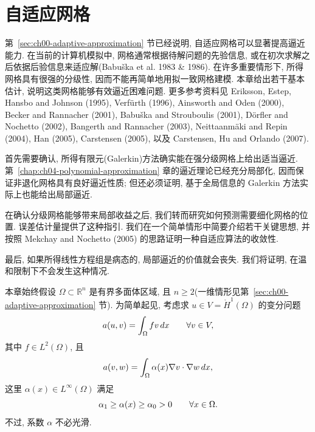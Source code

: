 \section{自适应网格}
\label{chap:ch09-adaptive-meshes}

第~\ref{sec:ch00-adaptive-approximation} 节已经说明, 自适应网格可以显著提高逼近能力. 在当前的计算机模拟中, 网格通常根据待解问题的先验信息, 或在初次求解之后依据后验信息来适应解(Babuška et al. 1983 \& 1986). 在许多重要情形下, 所得网格具有很强的分级性, 因而不能再简单地用拟一致网格建模. 本章给出若干基本估计, 说明这类网格能够有效逼近困难问题. 更多参考资料见 Eriksson, Estep, Hansbo and Johnson (1995), Verfürth (1996), Ainsworth and Oden (2000), Becker and Rannacher (2001), Babuška and Strouboulis (2001), Dörfler and Nochetto (2002), Bangerth and Rannacher (2003), Neittaanmäki and Repin (2004), Han (2005), Carstensen (2005), 以及 Carstensen, Hu and Orlando (2007).

首先需要确认, 所得有限元(Galerkin)方法确实能在强分级网格上给出适当逼近. 第~\ref{chap:ch04-polynomial-approximation} 章的逼近理论已经充分局部化, 因而保证非退化网格具有良好逼近性质; 但还必须证明, 基于全局信息的 Galerkin 方法实际上也能给出局部逼近.

在确认分级网格能够带来局部收益之后, 我们转而研究如何预测需要细化网格的位置. 误差估计量提供了这种指引. 我们在一个简单情形中简要介绍若干关键思想, 并按照 Mekchay and Nochetto (2005) 的思路证明一种自适应算法的收敛性.

最后, 如果所得线性方程组是病态的, 局部逼近的价值就会丧失. 我们将证明, 在温和限制下不会发生这种情况.

本章始终假设 $\Omega\subset\mathbb R^n$ 是有界多面体区域, 且 $n\geq2$(一维情形见第~\ref{sec:ch00-adaptive-approximation} 节). 为简单起见, 考虑求 $u\in V=\mathring H^1(\Omega)$ 的变分问题
\begin{equation}
\MathBookFormulaID{formula-ch09-model-variational-problem}
\label{eq:ch09-model-variational-problem}
a(u,v)=\int_\Omega fv\,dx
\qquad\forall v\in V,
\end{equation}
其中 $f\in L^2(\Omega)$, 且
\begin{equation}
\MathBookFormulaID{formula-ch09-diffusion-form}
\label{eq:ch09-diffusion-form}
a(v,w)=\int_\Omega\alpha(x)\nabla v\cdot\nabla w\,dx,
\end{equation}
这里 $\alpha(x)\in L^\infty(\Omega)$ 满足
\[
\MathBookFormulaID{formula-ch09-coefficient-bounds}
\alpha_1\geq\alpha(x)\geq\alpha_0>0
\qquad\forall x\in\Omega.
\]
不过, 系数 $\alpha$ 不必光滑.










